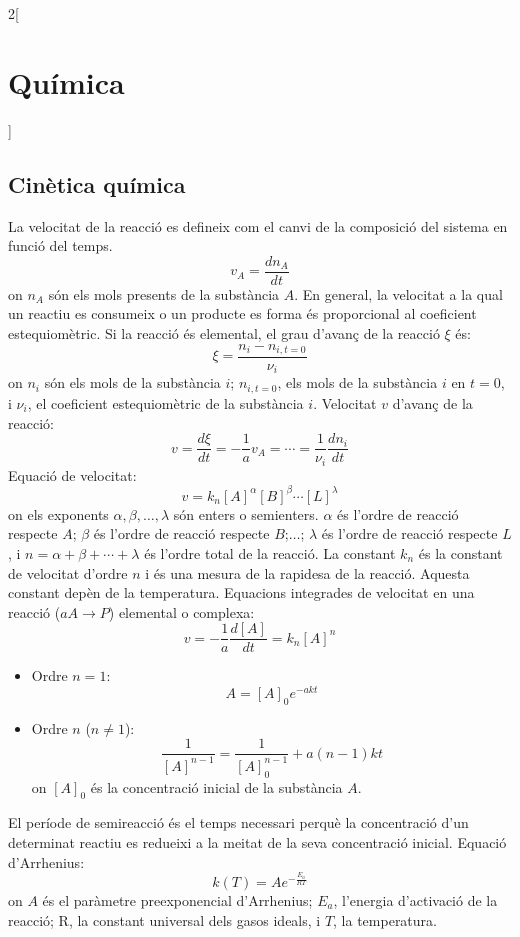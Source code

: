 \documentclass[../../../main.tex]{subfiles}
\begin{document}
\begin{multicols}{2}[\section{Química}]
\subsection{Cinètica química}
La velocitat de la reacció es defineix com el canvi de la
composició del sistema en funció del temps. $$v_A=\frac{dn_A}{dt}$$ {\footnotesize on $n_A$ són els mols presents de la substància $A$.}
En general, la velocitat a la qual un reactiu es consumeix o un producte es forma és proporcional al coeficient estequiomètric.\newline
Si la reacció és elemental, el grau d'avanç de la reacció $\xi$ és: $$\xi=\frac{n_i-n_{i,t=0}}{\nu_i}$$ {\footnotesize on $n_i$ són els mols de la substància $i$; $n_{i,t=0}$, els mols de la substància $i$ en $t=0$, i $\nu_i$, el coeficient estequiomètric de la substància $i$.}\newline
Velocitat $v$ d'avanç de la reacció: $$v=\frac{d\xi}{dt}=-\frac{1}{a}v_A=\cdots=\frac{1}{\nu_i}\frac{dn_i}{dt}$$
Equació de velocitat: $$v=k_n[A]^\alpha[B]^\beta\cdots[L]^\lambda$$ {\footnotesize on els exponents $\alpha,\beta,\ldots,\lambda$ són enters o semienters. $\alpha$ és l'ordre de reacció respecte $A$; $\beta$ és l'ordre de reacció res\-pec\-te $B$;$\ldots$; $\lambda$ és l'ordre de reacció res\-pec\-te $L$, i $n=\alpha+\beta+\cdots+\lambda$ és l'ordre total de la reacció. La constant $k_n$ és la constant de ve\-lo\-ci\-tat d’ordre $n$ i és una mesura de la rapidesa de la reacció. Aquesta constant depèn de la temperatura.}\newline
Equacions integrades de velocitat en una reacció ($aA\rightarrow P$) elemental o complexa: $$v=-\frac{1}{a}\frac{d[A]}{dt}=k_n[A]^n$$
\begin{itemize}
    \item Ordre $n=1$: $$A=[A]_0e^{-akt}$$
    \item Ordre $n$ ($n\ne1$): $$\frac{1}{[A]^{n-1}}=\frac{1}{[A]^{n-1}_0}+a(n-1)kt$$
{\footnotesize on $[A]_0$ és la concentració inicial de la substància $A$.}
\end{itemize}
El període de semireacció és el temps necessari perquè la
concentració d’un determinat reactiu es redueixi a la meitat de la seva concentració inicial.\newline
Equació d'Arrhenius: $$k(T)=Ae^{-\frac{E_a}{RT}}$$ {\footnotesize on $A$ és el paràmetre preexponencial d'Arrhenius; $E_a$, l'energia d'activació de la reacció; R, la cons\-tant universal dels gasos ideals, i $T$, la tem\-pe\-ra\-tu\-ra.}

\end{multicols}
\end{document}
